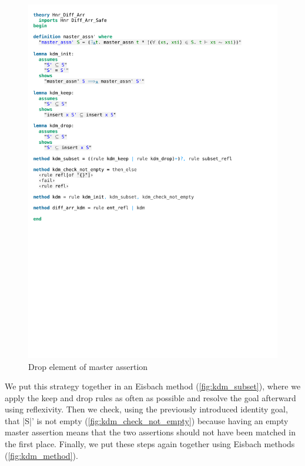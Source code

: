 \begin{figure}[htpb]
    \includegraphics[trim={0 17,4cm 0 10cm}, clip, width=1.00\textwidth]{figures/Theory_Hnr_Diff_Arr_KDM.pdf}
    \caption[Drop element of master assertion]{Drop element of master assertion}
    \label{fig:kdm_drop}
\end{figure}

\noindent We put this strategy together in an Eisbach method (\autoref{fig:kdm_subset}), where we apply the keep and drop rules as often as possible and resolve the goal afterward using reflexivity. Then we check, using the previously introduced identity goal, that |S|' is not empty (\autoref{fig:kdm_check_not_empty}) because having an empty master assertion means that the two assertions should not have been matched in the first place. Finally, we put these steps again together using Eisbach methods (\autoref{fig:kdm_method}).

